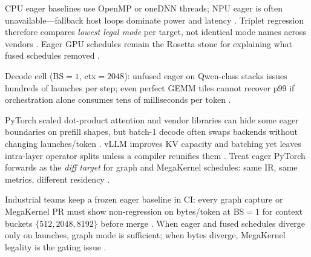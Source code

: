 CPU eager baselines use OpenMP or oneDNN threads; NPU eager is often unavailable---fallback host loops dominate power and latency \citep{dlbook,amd2024xdna,amd2024aie,chen2020compilerbasedhardw,yirage2026,patel2025llminference,taxbreak2026,memoryfloor2026,kwon2023vllm,liu2024deepseekv3,dao2022flashattention,semianalysis2024tma,nvidia2022hopper,nvidia2024cudagraphs,dao2023flashdecoding}. Triplet regression therefore compares \emph{lowest legal mode} per target, not identical mode names across vendors \citep{yirage2026,chen2020compilerbasedhardw,amd2024xdna,patel2025llminference,taxbreak2026,memoryfloor2026,dlbook,kwon2023vllm,liu2024deepseekv3,dao2022flashattention,amd2024aie,semianalysis2024tma,nvidia2022hopper,nvidia2024cudagraphs,dao2023flashdecoding}. Eager GPU schedules remain the Rosetta stone for explaining what fused schedules removed \citep{taxbreak2026,memoryfloor2026,patel2025llminference,yirage2026,chen2020compilerbasedhardw,amd2024xdna,amd2024aie,dlbook,kwon2023vllm,liu2024deepseekv3,dao2022flashattention,semianalysis2024tma,nvidia2022hopper,nvidia2024cudagraphs,dao2023flashdecoding}.

\begin{example}
Decode cell (BS${=}1$, ctx${=}2048$): unfused eager on Qwen-class stacks issues hundreds of launches per step; even perfect GEMM tiles cannot recover p99 if orchestration alone consumes tens of milliseconds per token \citep{taxbreak2026,nvidia2024cudagraphs,memoryfloor2026}.
\end{example}

PyTorch scaled dot-product attention and vendor libraries can hide some eager boundaries on prefill shapes, but batch-1 decode often swaps backends without changing launches/token \citep{patel2025llminference,dao2022flashattention,kwon2023vllm}. vLLM improves KV capacity and batching yet leaves intra-layer operator splits unless a compiler reunifies them \citep{kwon2023vllm,taxbreak2026}. Treat eager PyTorch forwards as the \emph{diff target} for graph and MegaKernel schedules: same IR, same metrics, different residency \citep{yirage2026,chen2020compilerbasedhardw,memoryfloor2026}.

Industrial teams keep a frozen eager baseline in CI: every graph capture or MegaKernel PR must show non-regression on bytes/token at BS${=}1$ for context buckets $\{512,2048,8192\}$ before merge \citep{memoryfloor2026,taxbreak2026,patel2025llminference}. When eager and fused schedules diverge only on launches, graph mode is sufficient; when bytes diverge, MegaKernel legality is the gating issue \citep{nvidia2024cudagraphs,yirage2026,amd2024xdna}.

